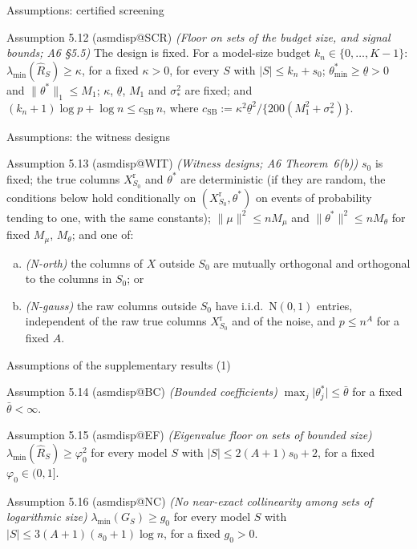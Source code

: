\documentclass[aspectratio=169]{beamer}
\makeatletter
\newcommand{\asmdisp}[1]{\csname asmdisp@#1\endcsname}
\newcommand{\abs}[1]{\lvert #1\rvert}
\newcommand{\norm}[1]{\lVert #1\rVert}
\newcommand{\Normal}{\mathrm{N}}
\newcommand{\lmin}{\lambda_{\min}}
\newcommand{\Xr}{X^{\mathrm r}}
\newcommand{\sigs}{\sigma_*}
\newcommand{\tstar}{\theta^*}
\newcommand{\tmin}{\theta^*_{\min}}
\newcommand{\Sz}{S_0}
\newcommand{\sz}{s_0}
\newcommand{\Rhat}{\hat R}
\newcommand{\tlow}{\underline\theta}
\makeatother
\begin{document}
\begin{frame}{Assumptions: certified screening}
\small
\begin{block}{Assumption 5.12 (\asmdisp{SCR}) \textit{(Floor on sets of the budget size, and signal bounds; A6 \S5.5)}}
The design is fixed. For a model-size budget $k_n\in\{0,\dots,K-1\}$: $\lmin(\Rhat_S)\ge\kappa$, for a fixed $\kappa>0$,
for every $S$ with $\abs{S}\le k_n+\sz$; $\tmin\ge\tlow>0$ and $\norm{\tstar}_1\le M_1$; $\kappa$, $\tlow$, $M_1$ and
$\sigs^2$ are fixed; and $(k_n+1)\log p+\log n\le c_{\mathrm{SB}}\,n$, where
$c_{\mathrm{SB}}:=\kappa^2\tlow^2/\{200(M_1^2+\sigs^2)\}$.
\end{block}
\end{frame}

\begin{frame}{Assumptions: the witness designs}
\small
\begin{block}{Assumption 5.13 (\asmdisp{WIT}) \textit{(Witness designs; A6 Theorem~6(b))}}
$\sz$ is fixed; the true columns $\Xr_{\Sz}$ and $\tstar$ are deterministic (if they are random, the conditions below hold
conditionally on $(\Xr_{\Sz},\tstar)$ on events of probability tending to one, with the same constants);
$\norm{\mu}^2\le nM_\mu$ and $\norm{\tstar}^2\le nM_\theta$ for fixed $M_\mu$, $M_\theta$; and one of:
\begin{enumerate}[(a)]
  \item \emph{(N-orth)} the columns of $X$ outside $\Sz$ are mutually orthogonal and orthogonal to the
    columns in $\Sz$; or
  \item \emph{(N-gauss)} the raw columns outside $\Sz$ have i.i.d.\ $\Normal(0,1)$ entries, independent
    of the raw true columns $\Xr_{\Sz}$ and of the noise, and $p\le n^A$ for a fixed $A$.
\end{enumerate}
\end{block}
\end{frame}

\begin{frame}{Assumptions of the supplementary results (1)}
\small
\begin{block}{Assumption 5.14 (\asmdisp{BC}) \textit{(Bounded coefficients)}}
$\max_{j}\abs{\theta^*_j}\le\bar\theta$ for a fixed $\bar\theta<\infty$.
\end{block}
\begin{block}{Assumption 5.15 (\asmdisp{EF}) \textit{(Eigenvalue floor on sets of bounded size)}}
$\lmin(\Rhat_S)\ge\varphi_0^2$ for every model $S$ with $\abs{S}\le2(A+1)\sz+2$, for a fixed $\varphi_0\in(0,1]$.
\end{block}
\begin{block}{Assumption 5.16 (\asmdisp{NC}) \textit{(No near-exact collinearity among sets of logarithmic size)}}
$\lmin(G_S)\ge g_0$ for every model $S$ with $\abs{S}\le3(A+1)(\sz+1)\log n$, for a fixed $g_0>0$.
\end{block}
\end{frame}
\end{document}
